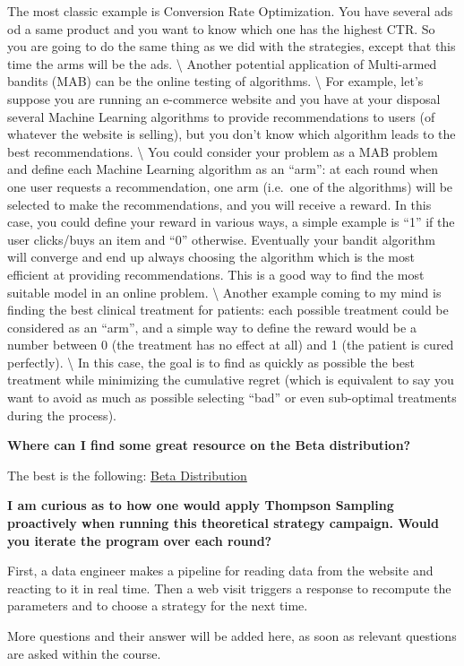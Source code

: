 \documentclass[]{book}
\begin{document}
The most classic example is Conversion Rate Optimization. You have several ads od a same product and you want to know which one has the highest CTR. So you are going to do the same thing as we did with the strategies, except that this time the arms will be the ads. \textbackslash{}
Another potential application of Multi-armed bandits (MAB) can be the online testing of algorithms. \textbackslash{}
For example, let's suppose you are running an e-commerce website and you have at your disposal several Machine Learning algorithms to provide recommendations to users (of whatever the website is selling), but you don't know which algorithm leads to the best recommendations. \textbackslash{}
You could consider your problem as a MAB problem and define each Machine Learning algorithm as an ``arm'': at each round when one user requests a recommendation, one arm (i.e.~one of the algorithms) will be selected to make the recommendations, and you will receive a reward. In this case, you could define your reward in various ways, a simple example is ``1'' if the user clicks/buys an item and ``0'' otherwise.
Eventually your bandit algorithm will converge and end up always choosing the algorithm which is the most efficient at providing recommendations. This is a good way to find the most suitable model in an online problem. \textbackslash{}
Another example coming to my mind is finding the best clinical treatment for patients: each possible treatment could be considered as an ``arm'', and a simple way to define the reward would be a number between 0 (the treatment has no effect at all) and 1 (the patient is cured perfectly). \textbackslash{}
In this case, the goal is to find as quickly as possible the best treatment while minimizing the cumulative regret (which is equivalent to say you want to avoid as much as possible selecting ``bad'' or even sub-optimal treatments during the process).

\textbf{Where can I find some great resource on the Beta distribution?}

The best is the following:
\href{https://stats.stackexchange.com/questions/47771/what-is-the-intuition-behind-beta-distribution}{Beta Distribution}

\textbf{I am curious as to how one would apply Thompson Sampling proactively when running this theoretical strategy campaign. Would you iterate the program over each round?}

First, a data engineer makes a pipeline for reading data from the website and reacting to it in real time. Then a web visit triggers a response to recompute the parameters and to choose a strategy for the next time.

More questions and their answer will be added here, as soon as relevant questions are asked within the course.


\end{document}
